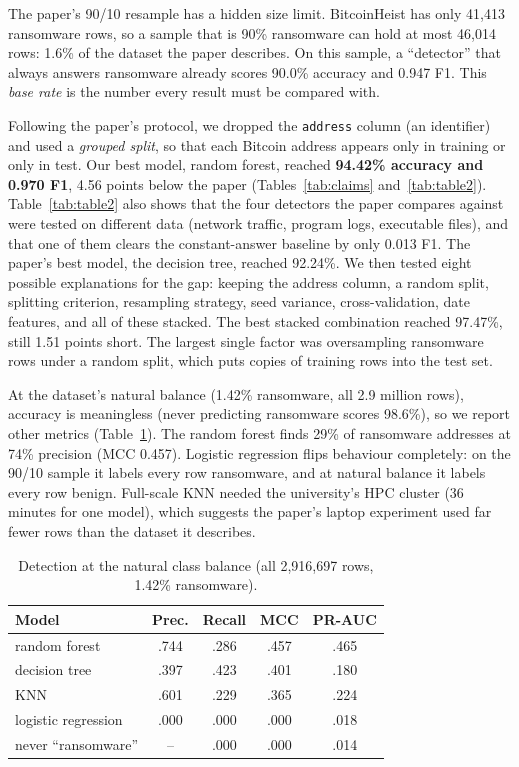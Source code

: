 \documentclass[11pt]{article}
\begin{document}
The paper's 90/10 resample has a hidden size limit. BitcoinHeist has only 41,413 ransomware rows,
so a sample that is 90\% ransomware can hold at most 46,014 rows: 1.6\% of the dataset the paper
describes. On this sample, a ``detector'' that always answers ransomware already scores 90.0\%
accuracy and 0.947 F1. This \emph{base rate} is the number every result must be compared with.

Following the paper's protocol, we dropped the \texttt{address} column (an identifier) and used a
\emph{grouped split}, so that each Bitcoin address appears only in training or only in test. Our
best model, random forest, reached \textbf{94.42\% accuracy and 0.970 F1}, 4.56 points below the
paper (Tables~\ref{tab:claims} and~\ref{tab:table2}). Table~\ref{tab:table2} also shows that the
four detectors the paper compares against were tested on different data (network traffic,
program logs, executable files), and that one of them clears the constant-answer baseline by only
0.013 F1. The paper's best model, the decision tree, reached 92.24\%. We then
tested eight possible explanations for the gap: keeping the address column, a random split,
splitting criterion, resampling strategy, seed variance, cross-validation, date features, and all
of these stacked. The best stacked combination reached 97.47\%, still 1.51 points short. The largest
single factor was oversampling ransomware rows under a random split, which puts copies of training
rows into the test set.

At the dataset's natural balance (1.42\% ransomware, all 2.9 million rows), accuracy is
meaningless (never predicting ransomware scores 98.6\%), so we report other metrics
(Table~\ref{tab:honest}). The random forest finds 29\% of ransomware addresses at 74\% precision
(MCC 0.457). Logistic regression flips behaviour completely: on the 90/10 sample it labels every
row ransomware, and at natural balance it labels every row benign. Full-scale KNN needed the
university's HPC cluster (36 minutes for one model), which suggests the paper's laptop experiment
used far fewer rows than the dataset it describes.

\begin{table}[t]
\centering
\small
\begin{tabular}{@{}lcccc@{}}
\toprule
\textbf{Model} & \textbf{Prec.} & \textbf{Recall} & \textbf{MCC} & \textbf{PR-AUC} \\
\midrule
random forest & .744 & .286 & .457 & .465 \\
decision tree & .397 & .423 & .401 & .180 \\
KNN & .601 & .229 & .365 & .224 \\
logistic regression & .000 & .000 & .000 & .018 \\
never ``ransomware'' & -- & .000 & .000 & .014 \\
\bottomrule
\end{tabular}
\caption{Detection at the natural class balance (all 2,916,697 rows, 1.42\% ransomware).}
\label{tab:honest}
\end{table}
\end{document}
